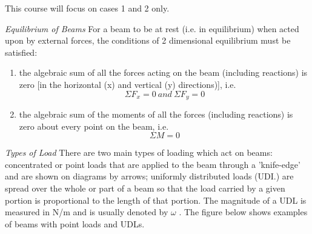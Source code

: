 \documentclass[12pt, letterpaper, twoside]{article}
\begin{document}
This course will focus on cases 1 and 2 only.	

\bigskip

\emph{Equilibrium of Beams}
For a beam to be at rest (i.e. in equilibrium) when acted upon by external forces, the conditions of 2 dimensional equilibrium must be satisfied:
\begin{enumerate}
	\item the algebraic sum of all the forces acting on the beam (including reactions) is zero [in the horizontal (x) and vertical (y) directions)], i.e.
	$$ \Sigma F_x =0 \ and \ \Sigma F_y = 0 $$
	\item the algebraic sum of the moments of all the forces (including reactions) is zero about every point on the beam, i.e.
	$$ \Sigma M = 0 $$
\end{enumerate}

	
\emph{Types of Load}
There are two main types of loading which act on beams: concentrated or point loads that are applied to the beam through a 'knife-edge' and are shown on diagrams by arrows; uniformly distributed loads (UDI.) are spread over the whole or part of a beam so that the load carried by a given portion is proportional to the length of that portion. The magnitude of a UDL is measured in N/m and is usually denoted by $\omega$ . The figure below shows examples of beams with point loads and UDLs.

\begin{center}
\end{center}


\bigskip
\end{document}
